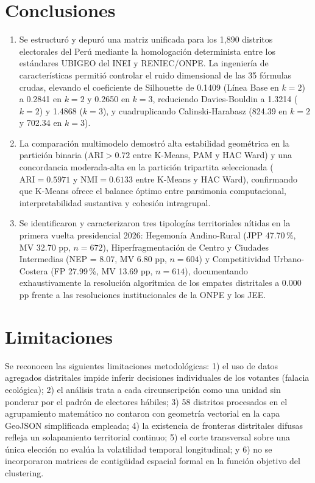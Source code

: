 \documentclass[conference,10pt,letterpaper]{IEEEtran}
\begin{document}
\section{Conclusiones}

\begin{enumerate}
    \item Se estructuró y depuró una matriz unificada para los 1,890 distritos electorales del Perú mediante la homologación determinista entre los estándares UBIGEO del INEI y RENIEC/ONPE. La ingeniería de características permitió controlar el ruido dimensional de las 35 fórmulas crudas, elevando el coeficiente de Silhouette de 0.1409 (Línea Base en $k = 2$) a 0.2841 en $k = 2$ y 0.2650 en $k = 3$, reduciendo Davies-Bouldin a 1.3214 ($k = 2$) y 1.4868 ($k = 3$), y cuadruplicando Calinski-Harabasz (824.39 en $k = 2$ y 702.34 en $k = 3$).
    \item La comparación multimodelo demostró alta estabilidad geométrica en la partición binaria ($\mathrm{ARI} > 0.72$ entre K-Means, PAM y HAC Ward) y una concordancia moderada-alta en la partición tripartita seleccionada ($\mathrm{ARI} = 0.5971$ y $\mathrm{NMI} = 0.6133$ entre K-Means y HAC Ward), confirmando que K-Means ofrece el balance óptimo entre parsimonia computacional, interpretabilidad sustantiva y cohesión intragrupal.
    \item Se identificaron y caracterizaron tres tipologías territoriales nítidas en la primera vuelta presidencial 2026: Hegemonía Andino-Rural (JPP 47.70\,\%, MV 32.70 pp, $n = 672$), Hiperfragmentación de Centro y Ciudades Intermedias (NEP = 8.07, MV 6.80 pp, $n = 604$) y Competitividad Urbano-Costera (FP 27.99\,\%, MV 13.69 pp, $n = 614$), documentando exhaustivamente la resolución algorítmica de los empates distritales a 0.000 pp frente a las resoluciones institucionales de la ONPE y los JEE.
\end{enumerate}

\section{Limitaciones}

Se reconocen las siguientes limitaciones metodológicas: 1) el uso de datos agregados distritales impide inferir decisiones individuales de los votantes (falacia ecológica); 2) el análisis trata a cada circunscripción como una unidad sin ponderar por el padrón de electores hábiles; 3) 58 distritos procesados en el agrupamiento matemático no contaron con geometría vectorial en la capa GeoJSON simplificada empleada; 4) la existencia de fronteras distritales difusas refleja un solapamiento territorial continuo; 5) el corte transversal sobre una única elección no evalúa la volatilidad temporal longitudinal; y 6) no se incorporaron matrices de contigüidad espacial formal en la función objetivo del clustering.
\end{document}
